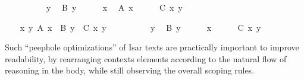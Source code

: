 \begin{isabellebody}
\begin{minipage}{0.5\textwidth}
\ \ \isamarkupfalse%
\ {}\isanewline
\ \ \ \ \isamarkupfalse%
\ y\ \isamarkupfalse%
\ {}B\ y{}\isanewline
\ \ \ \ \isamarkupfalse%
\ x\ \isamarkupfalse%
\ {}A\ x{}\isanewline
\ \ \ \ \isamarkupfalse%
\ {}C\ x\ y{}\ \isamarkupfalse%
\isanewline
\ \ \isamarkupfalse%
%
\end{minipage}\begin{minipage}{0.5\textwidth}
\ \ \isamarkupfalse%
\ {}{}x\ y{}\ A\ x\ {}\ B\ y\ {}\ C\ x\ y{}\isanewline
\ \ \isamarkupfalse%
\ {}\isanewline
\ \ \ \ \isamarkupfalse%
\ y\ \isamarkupfalse%
\ {}B\ y{}\isanewline
\ \ \ \ \isamarkupfalse%
\ x\isanewline
\ \ \ \ \isamarkupfalse%
\ {}C\ x\ y{}\ \isamarkupfalse%
\isanewline
\ \ \isamarkupfalse%
%
\endisatagproof
{\isafoldproof}%
%
\isadelimproof
%
\endisadelimproof
%
\end{minipage}
%
\begin{isamarkuptext}%
\medskip\noindent Such ``peephole optimizations'' of Isar texts are
  practically important to improve readability, by rearranging
  contexts elements according to the natural flow of reasoning in the
  body, while still observing the overall scoping rules.


\end{isamarkuptext}
\end{isabellebody}

